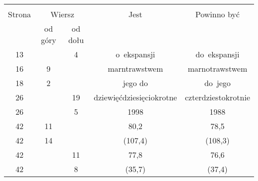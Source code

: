\documentclass[a4paper,11pt]{article}
\begin{document}
\vspace{\spaceFour}




\begin{center}

  \begin{tabular}{|c|c|c|c|c|}
    \hline
    & \multicolumn{2}{c|}{} & & \\
    Strona & \multicolumn{2}{c|}{Wiersz} & Jest
                              & Powinno być \\ \cline{2-3}
    & od góry & od dołu & & \\
    \hline
    13  & &  4 & o~ekspansji & do~ekspansji \\
    16  &  9 & & marntrawstwem & marnotrawstwem \\
    18  &  2 & & jego do & do~jego \\
    26  & & 19 & dziewięćdziesięciokrotne & czterdziestokrotnie \\
    26  & &  5 & 1998 & 1988 \\
    42  & 11 & & 80,2 & 78,5 \\
    42  & 14 & & (107,4) & (108,3) \\
    42  & & 11 & 77,8 &  76,6 \\
    42  & &  8 & (35,7) & (37,4) \\
    \hline
  \end{tabular}

\end{center}

\vspace{\spaceTwo}












\end{document}
